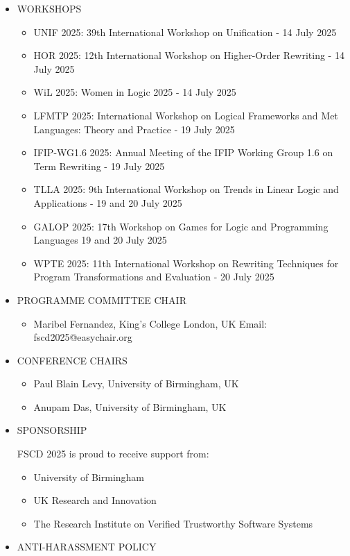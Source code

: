 \documentclass[prodmode,acmtecs]{acmsmall} %
\begin{document}
\begin{itemize}
\item  WORKSHOPS 
 
\begin{itemize}\item  UNIF 2025: 39th International Workshop on Unification - 14 July 2025
\item  HOR 2025: 12th International Workshop on Higher-Order Rewriting - 14 July 2025
\item  WiL 2025: Women in Logic 2025 - 14 July 2025
\item  LFMTP 2025: International Workshop on Logical Frameworks and Met Languages: Theory and Practice - 19 July 2025
\item  IFIP-WG1.6 2025: Annual Meeting of the IFIP Working Group 1.6 on Term Rewriting - 19 July 2025
\item  TLLA 2025: 9th International Workshop on Trends in Linear Logic and Applications - 19 and 20 July 2025
\item  GALOP 2025: 17th Workshop on Games for Logic and Programming Languages 19 and 20 July 2025
\item  WPTE 2025: 11th International Workshop on Rewriting Techniques for Program Transformations and Evaluation - 20 July 2025
\end{itemize} 
\item  PROGRAMME COMMITTEE CHAIR  
 
\begin{itemize}\item  Maribel Fernandez, King's College London, UK Email: fscd2025@easychair.org
\end{itemize} 
\item  CONFERENCE CHAIRS 
 
\begin{itemize}\item  Paul Blain Levy, University of Birmingham, UK
\item  Anupam Das, University of Birmingham, UK
\end{itemize} 
\item  SPONSORSHIP 
 
  FSCD 2025 is proud to receive support from: 
 
\begin{itemize}\item  University of Birmingham
\item  UK Research and Innovation
\item  The Research Institute on Verified Trustworthy Software Systems
\end{itemize} 
\item  ANTI-HARASSMENT POLICY 
 

\end{itemize}
\end{document}
